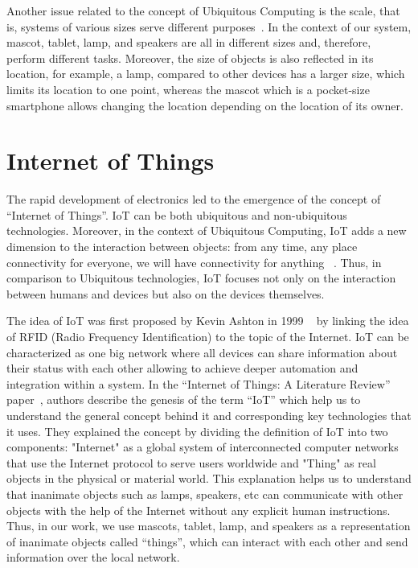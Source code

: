 Another issue related to the concept of Ubiquitous Computing is the scale,
that is, systems of various sizes serve different purposes~\cite{weiser1999computer}.
In the context of our system, mascot, tablet, lamp, and speakers are all in
different sizes and, therefore, perform different tasks.
Moreover, the size of objects is also reflected in its location, for example, a lamp, compared
to other devices has a larger size, which limits its location to one point, whereas the mascot
which is a pocket-size smartphone allows changing the location depending on the location of its owner.

\section{Internet of Things}
\label{sec:Internet of Things}
The rapid development of electronics led to the emergence of the concept of “Internet of Things”.
IoT can be both ubiquitous and non-ubiquitous technologies.
Moreover, in the context of Ubiquitous
Computing, IoT adds a new dimension to the interaction between objects: from any time, any place
connectivity for everyone, we will have connectivity for anything ~\cite{tan2010future}.
Thus, in comparison to Ubiquitous technologies, IoT focuses not only on the interaction
between humans and devices but also on the devices themselves.

The idea of IoT was first proposed by Kevin Ashton in 1999 ~\cite{ashton2009internet}
by linking the idea of RFID (Radio Frequency Identification) to the topic of the Internet.
IoT can be characterized as one big network where all devices can share information about their status with
each other allowing to achieve deeper automation and integration within a system.
In the “Internet of Things: A Literature Review” paper~\cite{madakam2015internet}, authors describe
the genesis of the term “IoT” which help us to understand the general concept behind it and
corresponding key technologies that it uses.
They explained the concept by dividing the definition of IoT into two components: "Internet"
as a global system of interconnected computer networks that use the Internet protocol to serve users worldwide
and "Thing" as real objects in the physical or material world.
This explanation helps us to understand that inanimate objects such as lamps, speakers,
etc can communicate with other objects with the help of the Internet without any explicit human instructions.
Thus, in our work, we use mascots, tablet, lamp, and speakers as a representation of inanimate
objects called “things”, which can interact with each other and send information over the local network.

